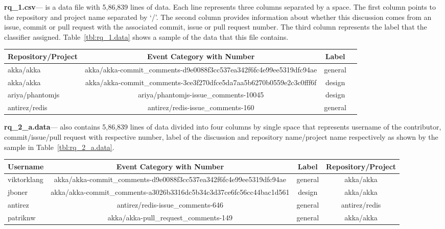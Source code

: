 \noindent\textbf{rq\_1.csv}--- is a data file with 5,86,839 lines of data. Each line represents three columns separated by a space. The first column points to the repository and project name separated by `/'. The second column provides information about whether this discussion comes from an issue, commit or pull request with the associated commit, issue or pull request number. The third column represents the label that the classifier assigned. Table~\ref{tbl:rq_1.data} shows a sample of the data that this file contains.
\begin{table*}
	\centering
	\caption{Data sample in rq\_1.data}
	\label{tbl:rq_1.data}
	\begin{tabular}{lccc} 
		\toprule
		\textbf{Repository/Project} & \textbf{Event Category with Number}  & \textbf{Label}  \\
		\midrule
		akka/akka & akka/akka-commit\_comments-d9e0088f3cc537ea342f6fc4e99ee5319dfc94ae & general \\
		akka/akka & akka/akka-commit\_comments-3ce3f270dfce5da7aa5b6270b0559e2c3c0fff6f & design \\
		ariya/phantomjs & ariya/phantomjs-issue\_comments-10045 & design \\
		antirez/redis & antirez/redis-issue\_comments-160 & general \\
		\bottomrule
	\end{tabular}
\end{table*}

\noindent\textbf{rq\_2\_a.data}--- also contains 5,86,839 lines of data divided into four columns by single space that represents username of the contributor, commit/issue/pull request with respective number, label of the discussion and repository name/project name respectively as shown by the sample in Table~\ref{tbl:rq_2_a.data}.
\begin{table*}
	\centering
	\caption{Data sample in rq\_2\_a.data}
	\label{tbl:rq_2_a.data}
	\begin{tabular}{lccc} 
		\toprule
		\textbf{Username} & \textbf{Event Category with Number}  & \textbf{Label} & \textbf{Repository/Project}  \\
		\midrule
		viktorklang & akka/akka-commit\_comments-d9e0088f3cc537ea342f6fc4e99ee5319dfc94ae & general & akka/akka \\
		jboner & akka/akka-commit\_comments-a3026b3316dc5b34c3d37ce6fc56cc44bac1d561 & design & akka/akka \\
		antirez & antirez/redis-issue\_comments-646 & general & antirez/redis \\
		patriknw & akka/akka-pull\_request\_comments-149 & general & akka/akka \\
		\bottomrule
	\end{tabular}
\end{table*}

